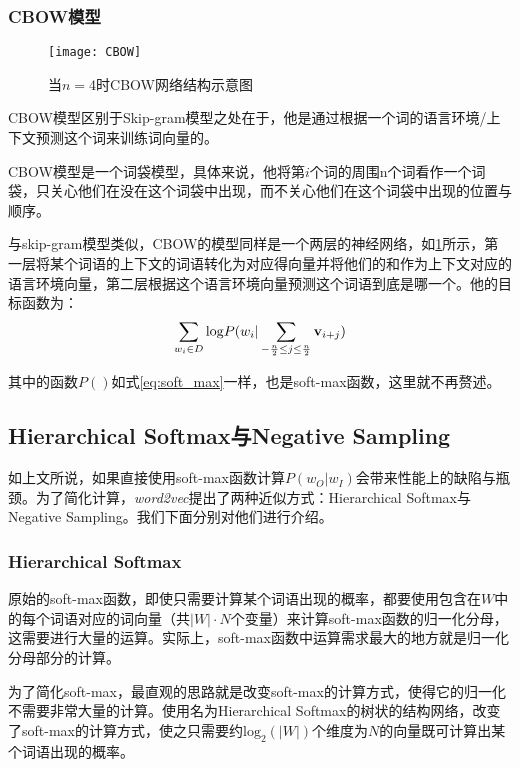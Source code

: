 \subsubsection{CBOW模型}

\begin{figure}
\centering
\texttt{[image: CBOW]}
\caption{当$n=4$时CBOW网络结构示意图}
\label{fig:CBOW}
\end{figure}

CBOW模型区别于Skip-gram模型之处在于，他是通过根据一个词的语言环境/上下文预测这个词来训练词向量的。

CBOW模型是一个词袋模型，具体来说，他将第$i$个词的周围n个词看作一个词袋，只关心他们在没在这个词袋中出现，而不关心他们在这个词袋中出现的位置与顺序。

与skip-gram模型类似，CBOW的模型同样是一个两层的神经网络，如\ref{fig:CBOW}所示，第一层将某个词语的上下文的词语转化为对应得向量并将他们的和作为上下文对应的语言环境向量，第二层根据这个语言环境向量预测这个词语到底是哪一个。他的目标函数为：
\begin{eqnarray*}
\sum_{w_i \in D} \mathrm{log}P(w_{i} | \sum_{-\frac{n}{2}\leq j \leq \frac{n}{2}} {{\mathbf v}}_{i+j})
\end{eqnarray*}

其中的函数$P()$如式\ref{eq:soft_max}一样，也是soft-max函数，这里就不再赘述。

\subsection{Hierarchical Softmax与Negative Sampling}

如上文所说，如果直接使用soft-max函数计算$P(w_O | w_I)$会带来性能上的缺陷与瓶颈。为了简化计算，\emph{word2vec}提出了两种近似方式：Hierarchical Softmax与Negative Sampling。我们下面分别对他们进行介绍。

\subsubsection{Hierarchical Softmax}

原始的soft-max函数，即使只需要计算某个词语出现的概率，都要使用包含在$W$中的每个词语对应的词向量（共$|W|\cdot N$个变量）来计算soft-max函数的归一化分母，这需要进行大量的运算。实际上，soft-max函数中运算需求最大的地方就是归一化分母部分的计算。

为了简化soft-max，最直观的思路就是改变soft-max的计算方式，使得它的归一化不需要非常大量的计算。\cite{morin2005hierarchical}使用名为Hierarchical Softmax的树状的结构网络，改变了soft-max的计算方式，使之只需要约$\mathrm{log}_2(|W|)$个维度为$N$的向量既可计算出某个词语出现的概率。

